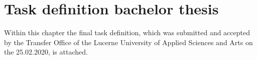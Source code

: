 \clearpage
{}

\chapter{Task definition bachelor thesis}
\label{app:Task-Definition}

Within this chapter the final task definition, which was submitted and accepted by the Transfer Office of the Lucerne University of Applied Sciences and Arts on the 25.02.2020, is attached.


